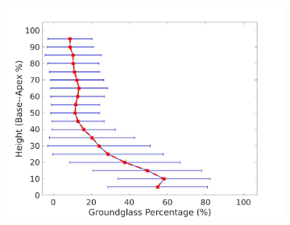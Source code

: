 \begin{figure}[H]
\begin{subfigure}{.4\linewidth}
  \includegraphics[width=\linewidth,trim={{.0\wd0} {.0\wd0} {.0\wd0} {.0\wd0}},clip]{QuantitativeAnalysis/Image/RightLungGroundglassDiseaseAgainstHeight.jpg}
  \caption{}
  \label{fig:DiseaseAgainstHeight-b}
\end{subfigure}
\begin{subfigure}{.4\linewidth}%

\end{subfigure}
\end{figure}
